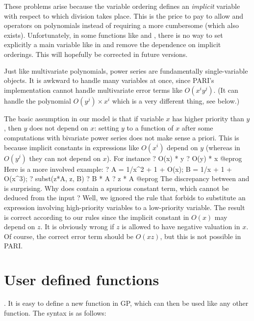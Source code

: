 These problems arise because the variable ordering defines an \emph{implicit}
variable with respect to which division takes place. This is
the price to pay to allow \kbd{\%} and \kbd{/} operators on polynomials
instead of requiring a more cumbersome 
(which also exists). Unfortunately, in some functions like  and
, there is no way to set explicitly a main variable like in
 and remove the dependence on implicit orderings. This will
hopefully be corrected in future versions.

Just like multivariate polynomials, power series are fundamentally
single-variable objects. It is awkward to handle many variables at once,
since PARI's implementation cannot handle multivariate error terms like
$O(x^i y^j)$. (It can handle the polynomial $O(y^j) \times x^i$ which is
a very different thing, see below.)

The basic assumption in our model is that if variable $x$ has higher
priority than $y$, then $y$ does not depend on $x$: setting $y$ to a
function of $x$ after some computations with bivariate power series does
not make sense a priori. This is because implicit constants in
expressions like $O(x^i)$ depend on $y$ (whereas in $O(y^j)$ they can not
depend on $x$). For instance
\bprog
  ? O(x) * y
  ? O(y) * x
@eprog\noindent
Here is a more involved example:
\bprog
  ? A = 1/x^2 + 1 + O(x); B = 1/x + 1 + O(x^3);
  ? subst(z*A, z, B)
  ? B * A
  ? z * A
@eprog\noindent
The discrepancy between  and  is surprising. Why does
 contain a spurious constant term, which cannot be
deduced from the input ? Well, we ignored the rule that forbids to
substitute an expression involving high-priority variables
to a low-priority variable. The result  is correct according to
our rules since the implicit constant in $O(x)$ may depend on $z$. It is
obviously wrong if $z$ is allowed to have negative valuation in $x$. Of
course, the correct error term should be $O(xz)$, but this is not
possible in PARI.

\section{User defined functions}
\label{se:user_defined}

.
It is easy to define a new function in GP, which can then be used like any
other function. The syntax is as follows:

